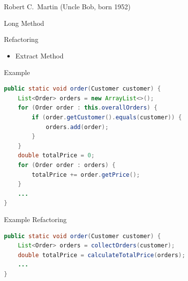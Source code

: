 \begin{frame}[fragile]
	\frametitle{\insertsubsection\ }
	\begin{fancycolumns}[animation=keep]
		\begin{note}{{Robert C.\ Martin (Uncle Bob, born 1952)}}
			 
		\end{note}
		\begin{definition}{Long Method}
			\small
		\end{definition}
		\begin{definition}{Refactoring}
			\begin{itemize}
				\item Extract Method
			\end{itemize}
		\end{definition}
		\nextcolumn
		\begin{example}{Example}
			\vspace{-3mm}
			\begin{lstlisting}[language=Java,basicstyle=\footnotesize]
public static void order(Customer customer) {
	List<Order> orders = new ArrayList<>();
	for (Order order : this.overallOrders) {
		if (order.getCustomer().equals(customer)) {
			orders.add(order);
		}
	}
	double totalPrice = 0;
	for (Order order : orders) {
		totalPrice += order.getPrice();
	}
	...
}
			\end{lstlisting}
		\end{example}
		\pause
		\begin{example}{Example Refactoring}
			\vspace{-3mm}
				\begin{lstlisting}[language=Java, basicstyle=\footnotesize]
public static void order(Customer customer) {
	List<Order> orders = collectOrders(customer);
	double totalPrice = calculateTotalPrice(orders);
	...
}
			\end{lstlisting}
		\end{example}
	\end{fancycolumns}
\end{frame}

